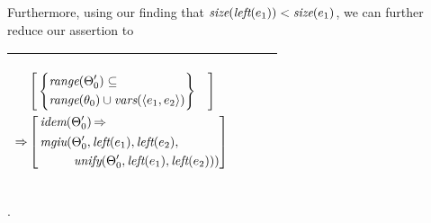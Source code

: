 \documentclass[runningheads]{llncs}
\DeclareMathOperator{\uimplies}{\Rightarrow}
\DeclareMathOperator{\unify}{\emph{unify}}
\DeclareMathOperator{\lef}{\emph{left}}
\DeclareMathOperator{\idem}{\emph{idem}}
\DeclareMathOperator{\mgiu}{\emph{mgiu}}
\begin{document}
Furthermore, using our finding that $\size(\lef(\e{1})) < \size(\e{1})$, we can further reduce our assertion to
  \begin{center}
  \begin{tabular}{|m{}|m{}||m{}|}
\hline
\begin{center}
{$\begin{aligned}
 &\begin{aligned}
&\begin{aligned}
&\left[\begin{aligned}
 &\left\{\begin{aligned}
 &\range(\Thet{0}') \subseteq \\
  &\range(\thet{0})\cup\vars(\langle \e{1}, \e{2} \rangle) 
  \end{aligned}\right\} 
  \end{aligned} \right] 
  \end{aligned} 
\end{aligned} \\
 \uimplies &\left[\begin{aligned}&\idem(\Thet{0}') \uimplies \\
 &\begin{aligned}
    {\,\mgiu}(&\Thet{0}', \lef(\e{1}), \lef(\e{2}), \\
    &\unify(\Thet{0}', \lef(\e{1}), \lef(\e{2}))) 
\end{aligned}
\end{aligned}\right] \end{aligned}  $}  \hspace{1cm} 
\end{center}& &  \\  \hline
\end{tabular}.
\end{center}
\end{document}
